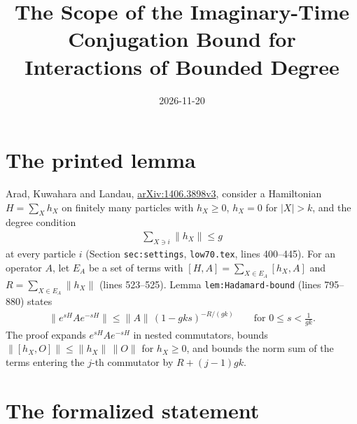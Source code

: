 \documentclass{article}
\title{The Scope of the Imaginary-Time Conjugation Bound for Interactions of Bounded Degree}
\author{}
\date{2026-11-20}
\begin{document}
\maketitle
{}

\section{The printed lemma}

Arad, Kuwahara and Landau,
\href{https://arxiv.org/abs/1406.3898}{arXiv:1406.3898v3}, consider a
Hamiltonian $H=\sum_Xh_X$ on finitely many particles with $h_X\ge0$,
$h_X=0$ for $|X|>k$, and the degree condition
\begin{align}
    \sum_{X\ni i}\lVert h_X\rVert\le g
    \label{eq:akl14_hadamard_degree}
\end{align}
at every particle $i$ (Section \texttt{sec:settings}, \texttt{low70.tex},
lines 400--445). For an operator $A$, let $E_A$ be a set of terms with
$[H,A]=\sum_{X\in E_A}[h_X,A]$ and $R=\sum_{X\in E_A}\lVert h_X\rVert$
(lines 523--525). Lemma \texttt{lem:Hadamard-bound} (lines 795--880) states
\begin{align}
    \lVert e^{sH}Ae^{-sH}\rVert\le\lVert A\rVert\,(1-gks)^{-R/(gk)}
    \qquad\text{for }0\le s<\frac1{gk}.
    \label{eq:akl14_hadamard_bound}
\end{align}
The proof expands $e^{sH}Ae^{-sH}$ in nested commutators, bounds
$\lVert[h_X,O]\rVert\le\lVert h_X\rVert\,\lVert O\rVert$ for $h_X\ge0$, and
bounds the norm sum of the terms entering the $j$-th commutator by
$R+(j-1)gk$.

\section{The formalized statement}
\end{document}
